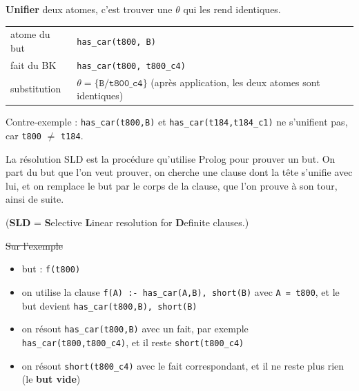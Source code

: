 \documentclass[10pt]{article}
\begin{document}
\textbf{Unifier} deux atomes, c'est trouver une  $\theta$ qui les rend identiques.
\begin{center}
\begin{tabular}{@{}l l@{}}
atome du but & \texttt{has\_car(t800, B)}\\
fait du BK & \texttt{has\_car(t800, t800\_c4)}\\
substitution & $\theta=\{\texttt{B}/\texttt{t800\_c4}\}$ \quad (après application, les deux atomes sont identiques)\\
\end{tabular}
\end{center}
Contre-exemple : \texttt{has\_car(t800,B)} et \texttt{has\_car(t184,t184\_c1)} ne s'unifient pas, car
\texttt{t800} $\neq$ \texttt{t184}.

La résolution SLD est la procédure qu'utilise Prolog pour prouver un but. On part du but que l'on veut
prouver, on cherche une clause dont la tête s'unifie avec lui, et on remplace le but par le corps de la
clause, que l'on prouve à son tour, ainsi de suite.\par\vspace{3pt}
(\textbf{SLD} = \textbf{S}elective \textbf{L}inear resolution for \textbf{D}efinite clauses.)

\st{Sur l'exemple}
\begin{itemize}
  \item but : \texttt{f(t800)}
  \item on utilise la clause \texttt{f(A) :- has\_car(A,B), short(B)} avec \texttt{A = t800}, et le but devient
        \texttt{has\_car(t800,B), short(B)}
  \item on résout \texttt{has\_car(t800,B)} avec un fait, par exemple \texttt{has\_car(t800,t800\_c4)}, et il reste
        \texttt{short(t800\_c4)}
  \item on résout \texttt{short(t800\_c4)} avec le fait correspondant, et il ne reste plus rien (le \textbf{but vide})
\end{itemize}
\end{document}

